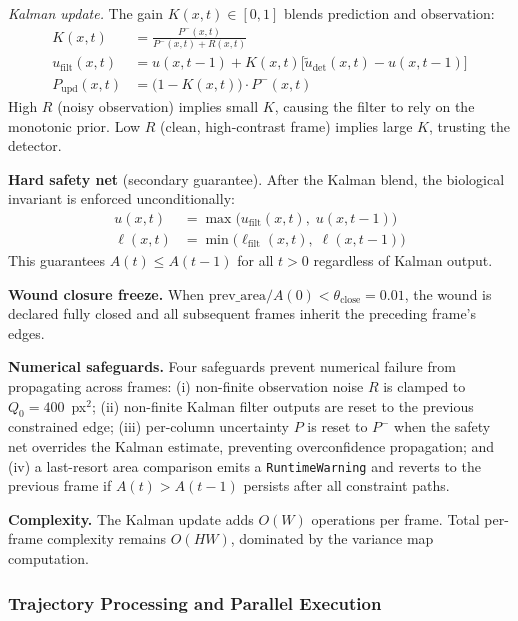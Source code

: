 \emph{Kalman update.}
The gain $K(x,t) \in [0, 1]$ blends prediction and observation:
\begin{align}
  K(x, t) &= \frac{P^-(x, t)}{P^-(x, t) + R(x, t)} \label{eq:kalman-gain} \\
  u_\text{filt}(x, t) &= u(x, t-1) + K(x, t)\bigl[\tilde{u}_\text{det}(x, t) - u(x, t-1)\bigr] \label{eq:kalman-update} \\
  P_\text{upd}(x, t) &= \bigl(1 - K(x, t)\bigr) \cdot P^-(x, t) \label{eq:P-update}
\end{align}
High $R$ (noisy observation) implies small $K$, causing the filter to rely on the monotonic
prior.
Low $R$ (clean, high-contrast frame) implies large $K$, trusting the detector.

\textbf{Hard safety net} (secondary guarantee).
After the Kalman blend, the biological invariant is enforced unconditionally:
\begin{align}
  u(x, t) &= \max\!\bigl(u_\text{filt}(x, t),\; u(x, t-1)\bigr) \label{eq:hard-upper} \\
  \ell(x, t) &= \min\!\bigl(\ell_\text{filt}(x, t),\; \ell(x, t-1)\bigr) \label{eq:hard-lower}
\end{align}
This guarantees $A(t) \leq A(t-1)$ for all $t > 0$ regardless of Kalman output.

\textbf{Wound closure freeze.}
When $\text{prev\_area} / A(0) < \theta_\text{close} = 0.01$, the wound is declared fully
closed and all subsequent frames inherit the preceding frame's edges.

\textbf{Numerical safeguards.}
Four safeguards prevent numerical failure from propagating across frames:
(i) non-finite observation noise $R$ is clamped to $Q_0 = 400$~px$^2$;
(ii) non-finite Kalman filter outputs are reset to the previous constrained edge;
(iii) per-column uncertainty $P$ is reset to $P^-$ when the safety net overrides the Kalman
estimate, preventing overconfidence propagation; and
(iv) a last-resort area comparison emits a \texttt{RuntimeWarning} and reverts to the previous
frame if $A(t) > A(t-1)$ persists after all constraint paths.

\textbf{Complexity.}
The Kalman update adds $O(W)$ operations per frame.
Total per-frame complexity remains $O(HW)$, dominated by the variance map computation.

\subsubsection{Trajectory Processing and Parallel Execution}

